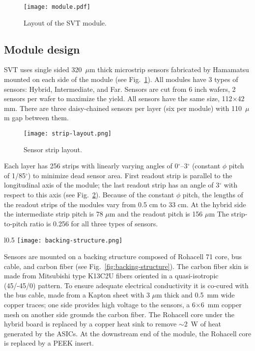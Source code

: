 \begin{figure}[hbt] 
\centering 
\texttt{[image: module.pdf]}
\caption{Layout of the SVT module.}
\label{fig:module}
\end{figure}

\subsection{Module design}

SVT uses single sided 320~$\mu$m thick microstrip sensors fabricated by Hamamatsu mounted on each side of the module (see Fig.~\ref{fig:module}). All modules have 3 types of sensors: Hybrid, Intermediate, and Far. Sensors are cut from 6 inch wafers, 2 sensors per wafer to maximize the yield. All sensors have the same size, 112$\times$42 mm. There are three daisy-chained sensors per layer (six per module) with 110~$\mu$m gap between them. 

\begin{figure}[hbt] 
\centering 
\texttt{[image: strip-layout.png]}
\caption{Sensor strip layout.}
\label{fig:strip-layout}
\end{figure}

Each layer has 256 strips with linearly varying angles of 0$^\circ$--3$^\circ$ (constant $\phi$ pitch of 1/85$^\circ$) to minimize dead sensor area. First readout strip is parallel to the longitudinal axis of the module; the last readout strip has an angle of 3$^\circ$ with respect to this axis (see Fig.~\ref{fig:strip-layout}). Because of the constant $\phi$ pitch, the lengths of the readout strips of the modules vary from 0.5 cm to 33 cm. At the hybrid side the intermediate strip pitch is 78 $\mu$m and the readout pitch is 156 $\mu$m The strip-to-pitch ratio is 0.256 for all three types of sensors.

\begin{wrapfigure}{l}{0.5\columnwidth}
\texttt{[image: backing-structure.png]}
\caption{Backing structure.}
\label{fig:backing-structure}
\end{wrapfigure}

Sensors are mounted on a backing structure composed of Rohacell 71 core, bus cable, and carbon fiber (see Fig.~\ref{fig:backing-structure}). The carbon fiber skin is made from Mitsubishi type K13C2U fibers oriented in a quasi-isotropic (45/-45/0) pattern. To ensure adequate electrical conductivity it is co-cured with the bus cable, made from a Kapton sheet with 3 $\mu$m thick and 0.5~mm wide copper traces; one side provides high voltage to the sensors, a 6$\times$6~mm copper mesh on another side grounds the carbon fiber. 
The Rohacell core under the hybrid board is replaced by a copper heat sink to remove $\sim$2~W of heat generated by the ASICs. At the downstream end of the module, the Rohacell core is replaced by a PEEK insert.  

